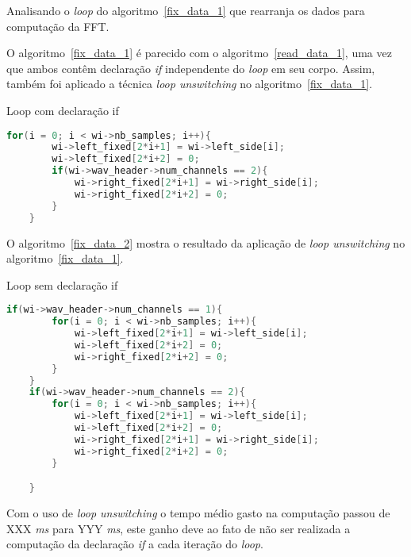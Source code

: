 
Analisando o \textit{loop} do algoritmo~\ref{fix_data_1} que rearranja os dados
para computação da FFT. 

O algoritmo~\ref{fix_data_1} é parecido com o algoritmo~\ref{read_data_1}, uma
vez que ambos contêm declaração \textit{if} independente do \textit{loop} em seu corpo. 
Assim, também foi aplicado a técnica \textit{loop unswitching} no
algoritmo~\ref{fix_data_1}.


\begin{algorithm}
    \caption{Loop com declaração if }
    \label{fix_data_1}
    \begin{lstlisting}[language=c]
    for(i = 0; i < wi->nb_samples; i++){
        wi->left_fixed[2*i+1] = wi->left_side[i];
        wi->left_fixed[2*i+2] = 0;
        if(wi->wav_header->num_channels == 2){
            wi->right_fixed[2*i+1] = wi->right_side[i];
            wi->right_fixed[2*i+2] = 0;
        }
    }
    \end{lstlisting}
\end{algorithm}

O algoritmo~\ref{fix_data_2} mostra o resultado da aplicação de \textit{loop
unswitching} no algoritmo~\ref{fix_data_1}.

\begin{algorithm}
    \caption{Loop sem declaração if }
    \label{fix_data_2}
    \begin{lstlisting}[language=c]
    if(wi->wav_header->num_channels == 1){
        for(i = 0; i < wi->nb_samples; i++){
            wi->left_fixed[2*i+1] = wi->left_side[i];
            wi->left_fixed[2*i+2] = 0;
            wi->right_fixed[2*i+2] = 0;
        }
    }
    if(wi->wav_header->num_channels == 2){
        for(i = 0; i < wi->nb_samples; i++){
            wi->left_fixed[2*i+1] = wi->left_side[i];
            wi->left_fixed[2*i+2] = 0;
            wi->right_fixed[2*i+1] = wi->right_side[i];
            wi->right_fixed[2*i+2] = 0;
        }

    }
    \end{lstlisting}
\end{algorithm}

Com o uso de \textit{loop unswitching} o tempo médio gasto na computação passou
de XXX \textit{ms} para YYY \textit{ms}, este ganho deve ao fato de não ser
realizada a computação da declaração \textit{if} a cada iteração do
\textit{loop}.


